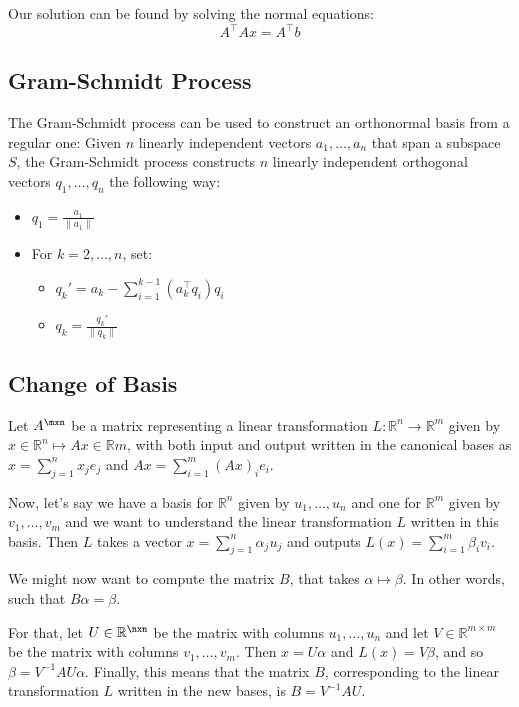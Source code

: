 Our solution can be found by solving the normal equations:
$$A^\top A x = A^\top b$$

\subsection{Gram-Schmidt Process}

The Gram-Schmidt process can be used to construct an orthonormal basis from a
regular one: Given $n$ linearly independent vectors $a_1,\dots,a_n$
that span a subspace $S$, the Gram-Schmidt process constructs $n$ linearly
independent orthogonal vectors $q_1,\dots,q_n$ the following way:

\begin{itemize}

    \item $q_1=\frac{a_1}{\lVert a_1 \rVert}$

    \item For $k=2,\dots,n$, set:

        \begin{itemize}
            \item $q_k'=a_k-\sum_{i=1}^{k-1}(a_k^\top q_i)q_i$

            \item $q_k=\frac{q_k'}{\lVert q_k \rVert}$
        \end{itemize}

\end{itemize}

\subsection{Change of Basis}

Let $A^{\mxn}$ be a matrix representing a linear transformation $L:\mathbb{R}^n\to\mathbb{R}^m$ given by $x\in\mathbb{R}^n\mapsto Ax\in\mathbb{R}m$, with both input and output written in the canonical bases as $x=\sum_{j=1}^{n}x_je_j$ and $Ax=\sum_{i=1}^{m}(Ax)_ie_i$.

Now, let's say we have a basis for $\mathbb{R}^n$ given by $u_1,\dots,u_n$ and one for $\mathbb{R}^m$ given by $v_1,\dots,v_m$ and we want to understand the linear transformation $L$ written in this basis. Then $L$ takes a vector $x=\sum_{j=1}^n\alpha_ju_j$ and outputs $L(x)=\sum_{i=1}^m\beta_iv_i$.

We might now want to compute the matrix $B$, that takes $\alpha\mapsto\beta$. In other words, such that $B\alpha=\beta$.

For that, let $U\in\mathbb{R}^{\nxn}$ be the matrix with columns $u_1,\dots,u_n$ and let $V\in\mathbb{R}^{m\times m}$ be the matrix with columns $v_1,\dots,v_m$. Then $x=U\alpha$ and $L(x)=V\beta$, and so $\beta=V^{-1}AU\alpha$. Finally, this means that the matrix $B$, corresponding to the linear transformation $L$ written in the new bases, is $B=V^{-1}AU$.
